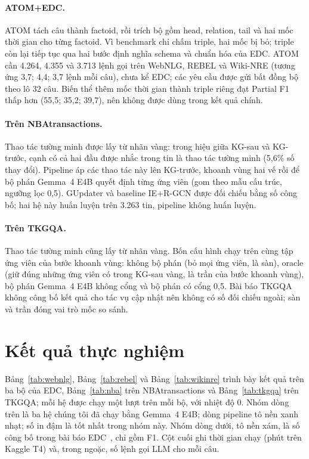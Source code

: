 \paragraph*{ATOM+EDC.}
ATOM tách câu thành factoid, rồi trích bộ gồm head, relation, tail và hai mốc thời gian cho từng factoid. Vì benchmark chỉ chấm triple, hai mốc bị bỏ; triple còn lại tiếp tục qua hai bước định nghĩa schema và chuẩn hóa của EDC.
ATOM cần 4.264, 4.355 và 3.713 lệnh gọi trên WebNLG, REBEL và Wiki-NRE (tương ứng 3,7; 4,4; 3,7 lệnh mỗi câu), chưa kể EDC; các yêu cầu được gửi bất đồng bộ theo lô 32 câu.
Biến thể thêm mốc thời gian thành triple riêng đạt Partial F1 thấp hơn (55,5; 35,2; 39,7), nên không được dùng trong kết quả chính.

\paragraph*{Trên NBAtransactions.}
Thao tác tường minh được lấy từ nhãn vàng: trong hiệu giữa KG-sau và KG-trước, cạnh có cả hai đầu được nhắc trong tin là thao tác tường minh (5,6\% số thay đổi).
Pipeline áp các thao tác này lên KG-trước, khoanh vùng hai vế rồi để bộ phán Gemma~4 E4B quyết định từng ứng viên (gom theo mẫu cấu trúc, ngưỡng lọc 0,5).
GUpdater và baseline IE+R-GCN được đối chiếu bằng số công bố; hai hệ này huấn luyện trên 3.263 tin, pipeline không huấn luyện.

\paragraph*{Trên TKGQA.}
Thao tác tường minh cũng lấy từ nhãn vàng. Bốn cấu hình chạy trên cùng tập ứng viên của bước khoanh vùng: không bộ phán (bỏ mọi ứng viên, là sàn), oracle (giữ đúng những ứng viên có trong KG-sau vàng, là trần của bước khoanh vùng), bộ phán Gemma~4 E4B không cổng và bộ phán có cổng 0,5.
Bài báo TKGQA không công bố kết quả cho tác vụ cập nhật nên không có số đối chiếu ngoài; sàn và trần đóng vai trò mốc so sánh.

\section{Kết quả thực nghiệm}\label{sec:exp-results}

Bảng~\ref{tab:webnlg}, Bảng~\ref{tab:rebel} và Bảng~\ref{tab:wikinre} trình bày kết quả trên ba bộ của EDC, Bảng~\ref{tab:nba} trên NBAtransactions và Bảng~\ref{tab:tkgqa} trên TKGQA; mỗi hệ được chạy một lượt trên mỗi bộ, với nhiệt độ 0.
Nhóm dòng trên là ba hệ chúng tôi đã chạy bằng Gemma~4 E4B; dòng pipeline tô nền xanh nhạt; số in đậm là tốt nhất trong nhóm này.
Nhóm dòng dưới, tô nền xám, là số công bố trong bài báo EDC~\cite{zhang2024edc}, chỉ gồm F1. Cột cuối ghi thời gian chạy (phút trên Kaggle T4) và, trong ngoặc, số lệnh gọi LLM cho mỗi câu.

